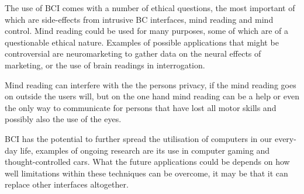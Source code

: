 The use of BCI comes with a number of ethical questions, the most important of which are side-effects from intrusive BC interfaces, mind reading and mind control. Mind reading could be used for many purposes, some of which are of a questionable ethical nature. Examples of possible applications that might be controversial are neuromarketing to gather data on the neural effects of marketing, or the use of brain readings in interrogation\cite{10.1371/journal.pbio.1001289}\cite{CB:CB252}.

Mind reading can interfere with the the persons privacy, if the mind reading goes on outside the users will, but on the one hand mind reading can be a help or even the only way to communicate for persons that have lost all motor skills and possibly also the use of the eyes.

BCI has the potential to further spread the utilisation of computers in our every-day life, examples of ongoing research are its use in computer gaming\cite{gurkok2012brain} and thought-controlled cars\cite{gohring2013semi}. What the future applications could be depends on how well limitations within these techniques can be overcome, it may be that it can replace other interfaces altogether.

